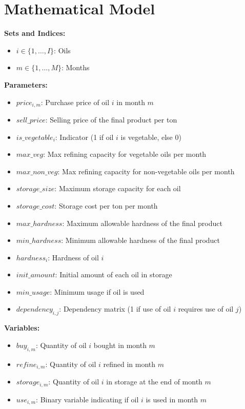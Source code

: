 \documentclass{article}
\begin{document}
\section*{Mathematical Model}

\textbf{Sets and Indices:}
\begin{itemize}
    \item $i \in \{1, \ldots, I\}$: Oils
    \item $m \in \{1, \ldots, M\}$: Months
\end{itemize}

\textbf{Parameters:}
\begin{itemize}
    \item $price_{i,m}$: Purchase price of oil $i$ in month $m$
    \item $sell\_price$: Selling price of the final product per ton
    \item $is\_vegetable_i$: Indicator (1 if oil $i$ is vegetable, else 0)
    \item $max\_veg$: Max refining capacity for vegetable oils per month
    \item $max\_non\_veg$: Max refining capacity for non-vegetable oils per month
    \item $storage\_size$: Maximum storage capacity for each oil
    \item $storage\_cost$: Storage cost per ton per month
    \item $max\_hardness$: Maximum allowable hardness of the final product
    \item $min\_hardness$: Minimum allowable hardness of the final product
    \item $hardness_i$: Hardness of oil $i$
    \item $init\_amount$: Initial amount of each oil in storage
    \item $min\_usage$: Minimum usage if oil is used
    \item $dependency_{i,j}$: Dependency matrix (1 if use of oil $i$ requires use of oil $j$)
\end{itemize}

\textbf{Variables:}
\begin{itemize}
    \item $buy_{i,m}$: Quantity of oil $i$ bought in month $m$
    \item $refine_{i,m}$: Quantity of oil $i$ refined in month $m$
    \item $storage_{i,m}$: Quantity of oil $i$ in storage at the end of month $m$
    \item $use_{i,m}$: Binary variable indicating if oil $i$ is used in month $m$
\end{itemize}
\end{document}
